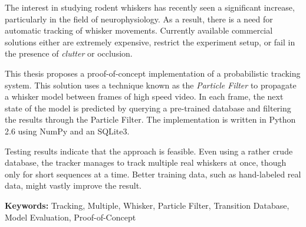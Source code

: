 The interest in studying rodent whiskers has recently seen a significant increase, 
particularly in the field of neurophysiology. As a result, there is a need for automatic 
tracking of whisker movements. Currently available commercial solutions either are 
extremely expensive, restrict the experiment setup, or fail in the presence of 
\emph{clutter} or occlusion. 

This thesis proposes a proof-of-concept implementation of a probabilistic tracking system. 
This solution uses a technique known as the \emph{Particle Filter} to propagate a whisker model between frames of high speed video. 
In each frame, the next state of the model is predicted by querying a pre-trained database and filtering the results 
through the Particle Filter. The implementation is written in Python 2.6 using NumPy\cite{NumPy} and an SQLite3\cite{SQLite3}.

Testing results indicate that the approach is feasible. Even using a
rather crude database, the tracker manages to track multiple real
whiskers at once, though only for short sequences at a time. Better
training data, such as hand-labeled real data, might vastly improve
the result.

\textbf{Keywords:} Tracking, Multiple, Whisker, Particle Filter, Transition Database, Model Evaluation, Proof-of-Concept
